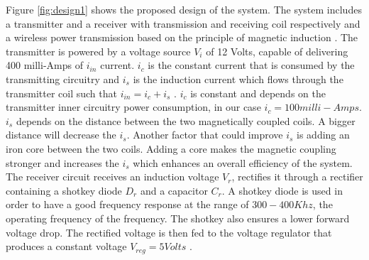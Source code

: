 Figure \ref{fig:design1} shows the proposed design of the system. The system includes a transmitter and a receiver with transmission and receiving coil respectively and a wireless power transmission based on the principle of magnetic induction \cite{IAmp}. The transmitter is powered by a voltage source $V_i$ of 12 Volts, capable of delivering 400 milli-Amps of $i_{in}$ current. $i_c$ is the constant current that is consumed by the transmitting circuitry and $i_s$ is the induction current which flows through the transmitter coil such that $i_{in} = i_c + i_s$ . $i_c$ is constant and depends on the transmitter inner circuitry power consumption, in our case $i_c = 100 milli-Amps $. $i_s$ depends on the distance between the two magnetically coupled coils. A bigger distance will decrease the $i_s$. Another factor that could improve $i_s$ is adding an iron core between the two coils. Adding a core makes the magnetic coupling stronger and increases the $i_s$ which enhances an overall efficiency of the system.
The receiver circuit receives an induction voltage $V_r$, rectifies it through a rectifier containing a shotkey diode $D_r$ and a capacitor $C_r$. A shotkey diode is used in order to have a good frequency response at the range of $ 300-400 Khz$,  the operating frequency of the frequency. The shotkey also ensures a lower forward voltage drop. The rectified voltage is then fed to the voltage regulator that produces a constant voltage $V_{reg} = 5 Volts$ .